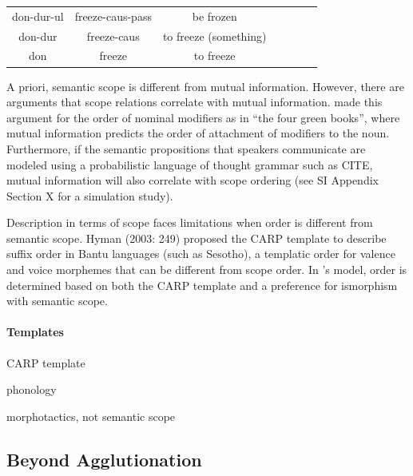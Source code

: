 \documentclass[11pt,letterpaper]{article}
\begin{document}
\begin{tabular}{ccccccc}
don-dur-ul & freeze-caus-pass & be frozen \\
don-dur & freeze-caus & to freeze (something) \\
don & freeze& to freeze \\
\end{tabular}

A priori, semantic scope is different from mutual information.
However, there are arguments that scope relations correlate with mutual information.
\citet{culbertson2020from} made this argument for the order of nominal modifiers as in ``the four green books'', where mutual information predicts the order of attachment of modifiers to the noun.
Furthermore, if the semantic propositions that speakers communicate are modeled using a probabilistic language of thought grammar such as CITE, mutual information will also correlate with scope ordering (see SI Appendix Section X for a simulation study).

Description in terms of scope faces limitations when order is different from semantic scope.
\cite{Hyman2003}
Hyman  (2003:  249) proposed the CARP template to describe suffix order in Bantu languages (such as Sesotho), a templatic order for valence and voice morphemes that can be different from scope order.
In \cite{Hyman2003}'s model, order is determined based on both the CARP template and a preference for ismorphism with semantic scope.

\paragraph{Templates}
CARP template


\cite{muysken1981quechua}

\cite{mccarthy2008generalized} phonology

\cite{hyman2003suffix}

\cite{kanu2009suffix} morphotactics, not semantic scope











\subsection{Beyond Agglutionation}
\end{document}
